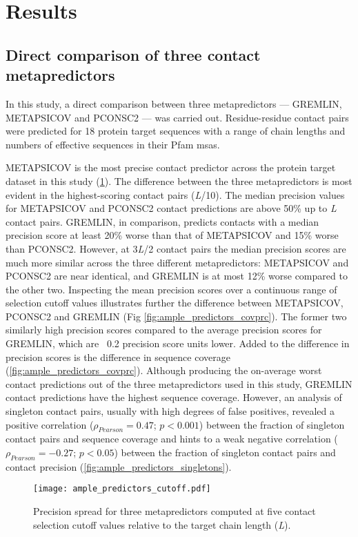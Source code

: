 \section{Results}
\subsection{Direct comparison of three contact metapredictors}
In this study, a direct comparison between three metapredictors --- GREMLIN, METAPSICOV and PCONSC2 --- was carried out. Residue-residue contact pairs were predicted for 18 protein target sequences with a range of chain lengths and numbers of effective sequences in their Pfam \gls{msa}s.

METAPSICOV is the most precise contact predictor across the protein target dataset in this study (\cref{fig:ample_predictors_cutoff}). The difference between the three metapredictors is most evident in the highest-scoring contact pairs (\textit{L}/10). The median precision values for METAPSICOV and PCONSC2 contact predictions are above 50\% up to \textit{L} contact pairs. GREMLIN, in comparison, predicts contacts with a median precision score at least 20\% worse than that of METAPSICOV and 15\% worse than PCONSC2. However, at 3\textit{L}/2 contact pairs the median precision scores are much more similar across the three different metapredictors: METAPSICOV and PCONSC2 are near identical, and GREMLIN is at most 12\% worse compared to the other two. Inspecting the mean precision scores over a continuous range of selection cutoff values illustrates further the difference between METAPSICOV, PCONSC2 and GREMLIN (Fig \ref{fig:ample_predictors_covprc}). The former two similarly high precision scores compared to the average precision scores for GREMLIN, which are ~0.2 precision score units lower. Added to the difference in precision scores is the difference in sequence coverage (\cref{fig:ample_predictors_covprc}). Although producing the on-average worst contact predictions out of the three metapredictors used in this study, GREMLIN contact predictions have the highest sequence coverage. However, an analysis of singleton contact pairs, usually with high degrees of false positives, revealed a positive correlation ($\rho_{Pearson}=0.47$; $p<0.001$) between the fraction of singleton contact pairs and sequence coverage and hints to a weak negative correlation ($\rho_{Pearson}=-0.27$; $p<0.05$) between the fraction of singleton contact pairs and contact precision (\cref{fig:ample_predictors_singletons}).

\begin{figure}[H]
    \centering
    \texttt{[image: ample\_predictors\_cutoff.pdf]}
    \caption{Precision spread for three metapredictors computed at five contact selection cutoff values relative to the target chain length (\textit{L}).}
    \label{fig:ample_predictors_cutoff}
\end{figure}

